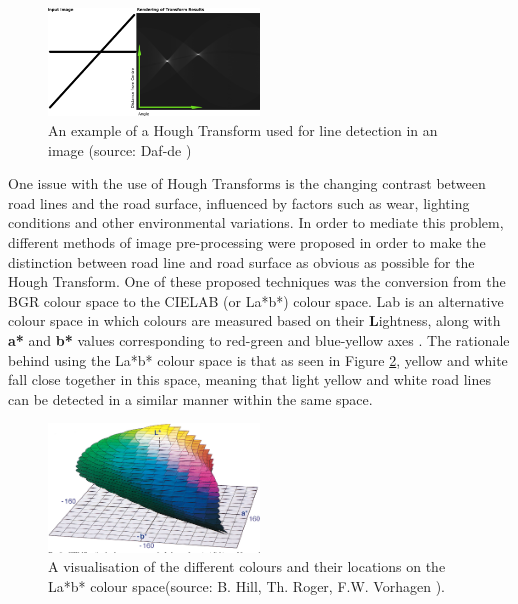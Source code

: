 \documentclass[titlepage, draft]{article}
\begin{document}
\begin{figure}
	\centering
	\includegraphics[width=0.5\textwidth]{Hough-example}
	\caption{An example of a Hough Transform used for line detection in an image (source: Daf-de \cite{huff_transform})}
	\label{HoughTransform}
\end{figure}

One issue with the use of Hough Transforms is the changing contrast between road lines and the road surface, influenced by
factors such as wear, lighting conditions and other environmental variations.
In order to mediate this problem, different methods of image pre-processing were proposed in order to make the distinction
between road line and road surface as obvious as possible for the Hough Transform.
One of these proposed techniques was the conversion from the BGR colour space to the CIELAB (or La*b*) colour space.
La\*b\* is an alternative colour space in which colours are measured based on their \textbf{L}ightness, along with \textbf{a*} and
\textbf{b*} values corresponding to red-green and blue-yellow axes \cite{Mclaren2008}.
The rationale behind using the La*b* colour space is that as seen in Figure \ref{LabColourSpace}, yellow and white fall close
together in this space, meaning that light yellow and white road lines can be detected in a similar manner within the same space.

\begin{figure}
	\centering
	\includegraphics[width=0.5\textwidth]{Lab-colour-space}
	\caption{A visualisation of the different colours and their locations on the La*b* colour space(source: B. Hill, Th. Roger, F.W. Vorhagen \cite{10.1145/248210.248212}).}
	\label{LabColourSpace}
\end{figure}
\end{document}
